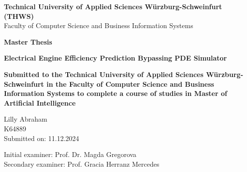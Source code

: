 \documentclass{report} %
\begin{document}
\begin{titlepage}
    \centering
    \vspace*{1cm}
    
    \Large \textbf{Technical University of Applied Sciences Würzburg-Schweinfurt (THWS)}\\
    \vspace{0.5cm}
    \Large Faculty of Computer Science and Business Information Systems\\
    \vspace{1cm}
    
    \huge \textbf{Master Thesis}\\
    \vspace{1.5cm}
    
    \Huge \textbf{Electrical Engine Efficiency Prediction  Bypassing PDE Simulator}\\
    \vspace{2cm}
    
    \large \textbf{Submitted to the Technical University of Applied Sciences Würzburg-Schweinfurt in the Faculty of Computer Science and Business Information Systems to
    complete a course of studies in Master of Artificial Intelligence}
    
    \vspace{1cm}
    
    \huge Lilly Abraham\\
    \huge K64889\\
    \vspace{1cm}
    \large Submitted on: 11.12.2024\\
    
    \vfill
    
    \large
    Initial examiner: Prof. Dr. Magda Gregorova\\
    Secondary examiner: Prof. Gracia Herranz Mercedes\\

\end{titlepage}

\newpage %
\end{document}
